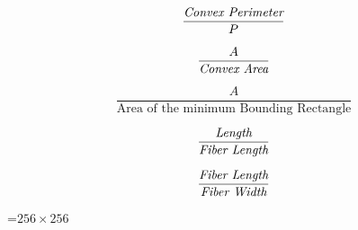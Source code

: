 {\newpage
\clearpage
\samepage \begin{figure}\centerline{}
 
\label{fig:area}
\end{figure}
}

{\newpage
\clearpage
\samepage \begin{displaymath}\frac{\mbox{{\em Convex Perimeter}}}{P} \end{displaymath}
}

{\newpage
\clearpage
\samepage \begin{displaymath}\frac{A}{\mbox{{\em Convex Area}}}              \end{displaymath}
}

{\newpage
\clearpage
\samepage \begin{displaymath}\frac{A}{\mbox{Area of the minimum Bounding 
Rectangle}}        \end{displaymath}
}

{\newpage
\clearpage
\samepage \begin{displaymath}\frac{\mbox{{\em Length}}}{\mbox{{\em Fiber 
Length}}} \end{displaymath}
}

{\newpage
\clearpage
\samepage \begin{displaymath}\frac{\mbox{{\em Fiber Length}}}{\mbox{{\em 
Fiber Width}}} \end{displaymath}
}

{\newpage
\clearpage
\samepage \setbox\sizebox=\hbox{$256 \times 256$}\box\sizebox
}

{\newpage
\clearpage
\samepage \begin{figure}\centerline{}

\label{fig:features}
\end{figure}
}


